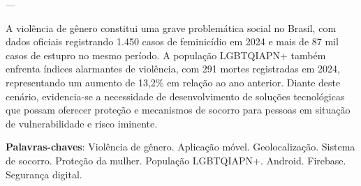 \documentclass[
	12pt,				    %
	openright,			    %
	oneside,			    %
	a4paper,			    %
    sumario=tradicional,    %
	english,			    %
	brazil,				    %
	]{abntex2}              %
\begin{document}
\frenchspacing

\pretextual

\imprimircapa

\imprimirfolhaderosto




 ---



\begin{resumo}
 \noindent
A violência de gênero constitui uma grave problemática social no Brasil, com dados oficiais registrando 1.450 casos de feminicídio em 2024 e mais de 87 mil casos de estupro no mesmo período. A população LGBTQIAPN+ também enfrenta índices alarmantes de violência, com 291 mortes registradas em 2024, representando um aumento de 13,2\% em relação ao ano anterior. Diante deste cenário, evidencia-se a necessidade de desenvolvimento de soluções tecnológicas que possam oferecer proteção e mecanismos de socorro para pessoas em situação de vulnerabilidade e risco iminente.

 \vspace{\onelineskip}

 \noindent
 \textbf{Palavras-chaves}: Violência de gênero. Aplicação móvel. Geolocalização. Sistema de socorro. Proteção da mulher. População LGBTQIAPN+. Android. Firebase. Segurança digital.
\end{resumo}
\end{document}

